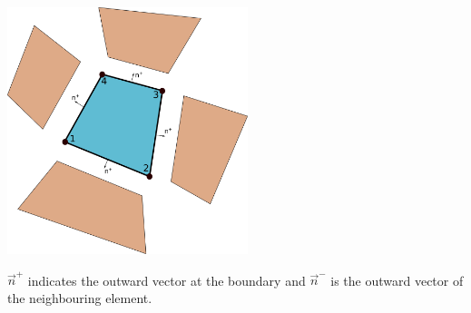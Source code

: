 \begin{center}
\includegraphics[width=7cm]{images/dgfem/dgelts}
\end{center}

$\vec{n}^+$ indicates the outward vector at the boundary and $\vec{n}^-$ is 
the outward vector of the neighbouring element.

